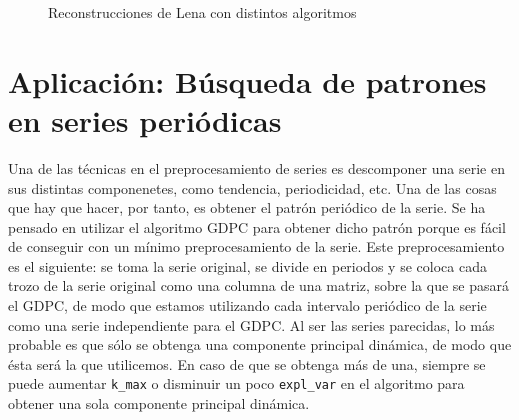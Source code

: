 \begin{figure}[H]
 \centering
 \caption{Reconstrucciones de Lena con distintos algoritmos}
 \label{f:LenaPCA}
\end{figure}

\newpage

\section{Aplicación: Búsqueda de patrones en series periódicas}

Una de las técnicas en el preprocesamiento de series es descomponer una serie en sus distintas componenetes, como tendencia, periodicidad, etc. Una de las cosas que hay que hacer, por tanto, es obtener el patrón periódico de la serie. Se ha pensado en utilizar el algoritmo GDPC para obtener dicho patrón porque es fácil de conseguir con un mínimo preprocesamiento de la serie. Este preprocesamiento es el siguiente: se toma la serie original, se divide en periodos y se coloca cada trozo de la serie original como una columna de una matriz, sobre la que se pasará el GDPC, de modo que estamos utilizando cada intervalo periódico de la serie como una serie independiente para el GDPC. Al ser las series parecidas, lo más probable es que sólo se obtenga una componente principal dinámica, de modo que ésta será la que utilicemos. En caso de que se obtenga más de una, siempre se puede aumentar \texttt{k\_max} o disminuir un poco \texttt{expl\_var} en el algoritmo para obtener una sola componente principal dinámica.\\

